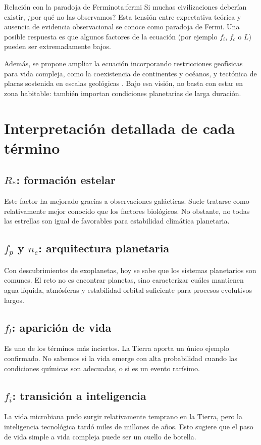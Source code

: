 \documentclass[12pt,oneside]{book}
\begin{document}
\begin{nota}{Relación con la paradoja de Fermi}{nota:fermi}
Si muchas civilizaciones deberían existir, ¿por qué no las observamos? Esta tensión entre expectativa teórica y ausencia de evidencia observacional se conoce como paradoja de Fermi. Una posible respuesta es que algunos factores de la ecuación (por ejemplo $f_i$, $f_c$ o $L$) pueden ser extremadamente bajos.
\end{nota}

Además, se propone ampliar la ecuación incorporando restricciones geofísicas para vida compleja, como la coexistencia de continentes y océanos, y tectónica de placas sostenida en escalas geológicas \cite{stern2024tectonics}. Bajo esa visión, no basta con estar en zona habitable: también importan condiciones planetarias de larga duración.

\section{Interpretación detallada de cada término}

\subsection{$R_*$: formación estelar}
Este factor ha mejorado gracias a observaciones galácticas. Suele tratarse como relativamente mejor conocido que los factores biológicos. No obstante, no todas las estrellas son igual de favorables para estabilidad climática planetaria.

\subsection{$f_p$ y $n_e$: arquitectura planetaria}
Con descubrimientos de exoplanetas, hoy se sabe que los sistemas planetarios son comunes. El reto no es encontrar planetas, sino caracterizar cuáles mantienen agua líquida, atmósferas y estabilidad orbital suficiente para procesos evolutivos largos.

\subsection{$f_l$: aparición de vida}
Es uno de los términos más inciertos. La Tierra aporta un único ejemplo confirmado. No sabemos si la vida emerge con alta probabilidad cuando las condiciones químicas son adecuadas, o si es un evento rarísimo.

\subsection{$f_i$: transición a inteligencia}
La vida microbiana pudo surgir relativamente temprano en la Tierra, pero la inteligencia tecnológica tardó miles de millones de años. Esto sugiere que el paso de vida simple a vida compleja puede ser un cuello de botella.
\end{document}
